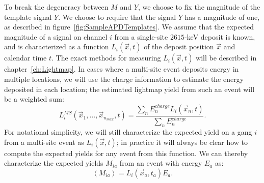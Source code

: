 To break the degeneracy between $M$ and $Y$, we choose to fix the magnitude of the template signal $Y$.  We choose to require that the signal $Y$ has a magnitude of one, as described in figure~\ref{fig:SampleAPDTemplates}.  We assume that the expected magnitude of a signal on channel $i$ from a single-site $2615$-keV deposit is known, and is characterized as a function $L_i(\vec{x}, t)$ of the deposit position $\vec{x}$ and calendar time $t$.  The exact methods for measuring $L_i(\vec{x}, t)$ will be described in chapter~\ref{ch:Lightmap}.  In cases where a multi-site event deposits energy in multiple locations, we will use the charge information to estimate the energy deposited in each location; the estimated lightmap yield from such an event will be a weighted sum:
\begin{equation}
L_i^{MS}(\vec{x}_1, \dots, \vec{x}_{n_{max}}, t) = \frac{\sum_n E_n^{charge} L_i(\vec{x}_n, t)}{\sum_n E_n^{charge}}.
\end{equation}
For notational simplicity, we will still characterize the expected yield on a gang $i$ from a multi-site event as $L_i(\vec{x}, t)$; in practice it will always be clear how to compute the expected yields for any event from this function.  We can thereby characterize the expected yields $M_{ia}$ from an event with energy $E_a$ as:
\begin{equation}
\left< M_{ia} \right> = L_i(\vec{x}_a, t_a) E_a.
\end{equation}

